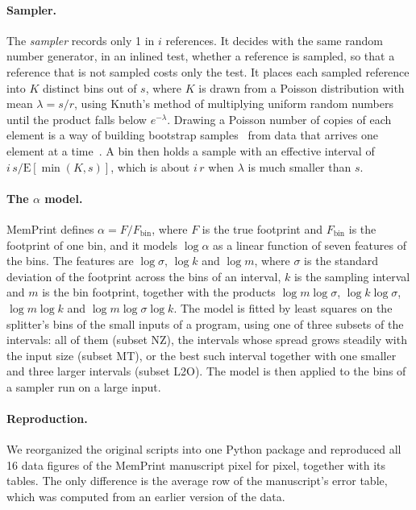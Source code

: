 \documentclass[11pt]{article}
\newcommand{\memprint}{MemPrint}
\newcommand{\term}[1]{\emph{#1}}
\begin{document}
\paragraph{Sampler.}
The \term{sampler} records only 1 in $i$ references. It decides with the same random number generator, in an inlined test, whether a reference is sampled, so that a reference that is not sampled costs only the test. It places each sampled reference into $K$ distinct bins out of $s$, where $K$ is drawn from a Poisson distribution with mean $\lambda = s/r$, using Knuth's method of multiplying uniform random numbers until the product falls below $e^{-\lambda}$. Drawing a Poisson number of copies of each element is a way of building bootstrap samples~\cite{efron1979} from data that arrives one element at a time~\cite{hanley2006poisson}. A bin then holds a sample with an effective interval of $i\,s/\mathrm{E}[\min(K, s)]$, which is about $i\,r$ when $\lambda$ is much smaller than $s$.

\paragraph{The $\alpha$ model.}
\memprint{} defines $\alpha = F/F_{\text{bin}}$, where $F$ is the true footprint and $F_{\text{bin}}$ is the footprint of one bin, and it models $\log \alpha$ as a linear function of seven features of the bins. The features are $\log \sigma$, $\log k$ and $\log m$, where $\sigma$ is the standard deviation of the footprint across the bins of an interval, $k$ is the sampling interval and $m$ is the bin footprint, together with the products $\log m \log \sigma$, $\log k \log \sigma$, $\log m \log k$ and $\log m \log \sigma \log k$. The model is fitted by least squares on the splitter's bins of the small inputs of a program, using one of three subsets of the intervals: all of them (subset NZ), the intervals whose spread grows steadily with the input size (subset MT), or the best such interval together with one smaller and three larger intervals (subset L2O). The model is then applied to the bins of a sampler run on a large input.

\paragraph{Reproduction.}
We reorganized the original scripts into one Python package and reproduced all 16 data figures of the \memprint{} manuscript pixel for pixel, together with its tables. The only difference is the average row of the manuscript's error table, which was computed from an earlier version of the data.
\end{document}
